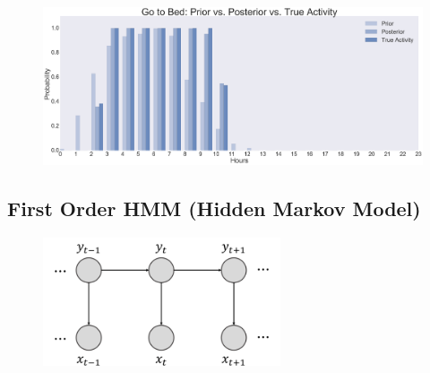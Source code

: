 \documentclass[10pt,letter]{article}
\numberwithin{equation}{section} %
\numberwithin{figure}{section} %
\numberwithin{table}{section} %
\begin{document}
\begin{figure}[h]
    \centering
    \includegraphics[width=18cm]{../plot/NB_result}
\end{figure}
\subsection{First Order HMM (Hidden Markov Model)}
\begin{figure}[h]
    \centering
\includegraphics[width=7cm]{../plot/1hmm}
\end{figure}
\end{document}
